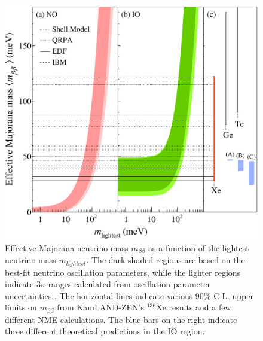 \begin{figure}[htb]
	\centering
	\includegraphics[scale=0.35]{klz800_result.png}
	\caption{Effective Majorana neutrino mass $m_{\beta\beta}$ as a function of the lightest neutrino mass $m_{lightest}$. The dark shaded regions are based on the best-fit neutrino oscillation parameters, while the lighter regions indicate 3$\sigma$ ranges calculated from oscillation parameter uncertainties \cite{PhysRevD.90.033005} \cite{Nufit}. The horizontal lines indicate various 90\% C.L. upper limits on $m_{\beta\beta}$ from KamLAND-ZEN's $^{136}$Xe results and a few different NME calculations. The blue bars on the right indicate three different theoretical predictions in the IO region. \cite{klz800_arxiv}}
	\label{fig:klz800_result}
\end{figure}

